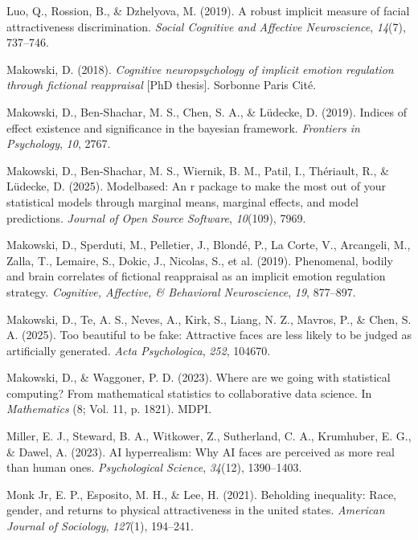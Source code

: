 \documentclass[
  jou,
  floatsintext,
  longtable,
  nolmodern,
  notxfonts,
  notimes,
  colorlinks=true,linkcolor=blue,citecolor=blue,urlcolor=blue]{apa7}
\newlength{\cslhangindent}
\newenvironment{CSLReferences}[2] %
 {\begin{list}{}{%
  \setlength{\itemindent}{0pt}
  \setlength{\leftmargin}{0pt}
  \setlength{\parsep}{0pt}
  \ifodd #1
   \setlength{\leftmargin}{\cslhangindent}
   \setlength{\itemindent}{-1\cslhangindent}
  \fi
  \setlength{\itemsep}{#2\baselineskip}}}
 {\end{list}}
\begin{document}
\begin{CSLReferences}{1}{0}
Luo, Q., Rossion, B., \& Dzhelyova, M. (2019). A robust implicit measure
of facial attractiveness discrimination. \emph{Social Cognitive and
Affective Neuroscience}, \emph{14}(7), 737--746.

Makowski, D. (2018). \emph{Cognitive neuropsychology of implicit emotion
regulation through fictional reappraisal} {[}PhD thesis{]}. Sorbonne
Paris Cit{é}.

Makowski, D., Ben-Shachar, M. S., Chen, S. A., \& Lüdecke, D. (2019).
Indices of effect existence and significance in the bayesian framework.
\emph{Frontiers in Psychology}, \emph{10}, 2767.

Makowski, D., Ben-Shachar, M. S., Wiernik, B. M., Patil, I., Thériault,
R., \& Lüdecke, D. (2025). Modelbased: An r package to make the most out
of your statistical models through marginal means, marginal effects, and
model predictions. \emph{Journal of Open Source Software},
\emph{10}(109), 7969.

Makowski, D., Sperduti, M., Pelletier, J., Blondé, P., La Corte, V.,
Arcangeli, M., Zalla, T., Lemaire, S., Dokic, J., Nicolas, S., et al.
(2019). Phenomenal, bodily and brain correlates of fictional reappraisal
as an implicit emotion regulation strategy. \emph{Cognitive, Affective,
\& Behavioral Neuroscience}, \emph{19}, 877--897.

Makowski, D., Te, A. S., Neves, A., Kirk, S., Liang, N. Z., Mavros, P.,
\& Chen, S. A. (2025). Too beautiful to be fake: Attractive faces are
less likely to be judged as artificially generated. \emph{Acta
Psychologica}, \emph{252}, 104670.

Makowski, D., \& Waggoner, P. D. (2023). Where are we going with
statistical computing? From mathematical statistics to collaborative
data science. In \emph{Mathematics} (8; Vol. 11, p. 1821). MDPI.

Miller, E. J., Steward, B. A., Witkower, Z., Sutherland, C. A.,
Krumhuber, E. G., \& Dawel, A. (2023). AI hyperrealism: Why AI faces are
perceived as more real than human ones. \emph{Psychological Science},
\emph{34}(12), 1390--1403.

Monk Jr, E. P., Esposito, M. H., \& Lee, H. (2021). Beholding
inequality: Race, gender, and returns to physical attractiveness in the
united states. \emph{American Journal of Sociology}, \emph{127}(1),
194--241.


\end{CSLReferences}
\end{document}
